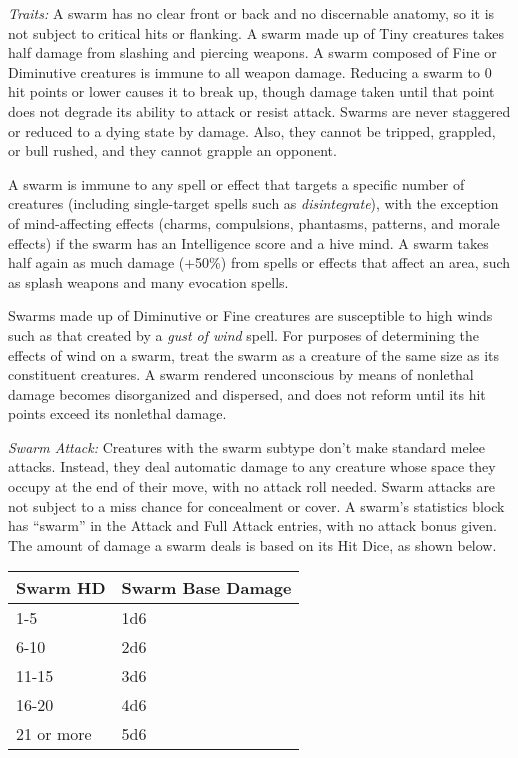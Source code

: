 \documentclass{article}
\begin{document}
\textit{Traits: }A swarm has no clear front or back and no discernable anatomy, 
so it is not subject to critical hits or flanking. A swarm made up of Tiny creatures 
takes half damage from slashing and piercing weapons. A swarm composed of Fine 
or Diminutive creatures is immune to all weapon damage. Reducing a swarm to 0 hit 
points or lower causes it to break up, though damage taken until that point does 
not degrade its ability to attack or resist attack. Swarms are never staggered 
or reduced to a dying state by damage. Also, they cannot be tripped, grappled, 
or bull rushed, and they cannot grapple an opponent.

A swarm is immune to any spell or effect that targets a specific number of creatures 
(including single-target spells such as \textit{disintegrate}), with the exception 
of mind-affecting effects (charms, compulsions, phantasms, patterns, and morale 
effects) if the swarm has an Intelligence score and a hive mind. A swarm takes 
half again as much damage (+50\%) from spells or effects that affect an area, such 
as splash weapons and many evocation spells.

Swarms made up of Diminutive or Fine creatures are susceptible to high winds such 
as that created by a \textit{gust of wind }spell. For purposes of determining the 
effects of wind on a swarm, treat the swarm as a creature of the same size as its 
constituent creatures. A swarm rendered unconscious by means of nonlethal damage 
becomes disorganized and dispersed, and does not reform until its hit points exceed 
its nonlethal damage.

\textit{Swarm Attack: }Creatures with the swarm subtype don't make standard melee 
attacks. Instead, they deal automatic damage to any creature whose space they occupy 
at the end of their move, with no attack roll needed. Swarm attacks are not subject 
to a miss chance for concealment or cover. A swarm's statistics block has ``swarm'' 
in the Attack and Full Attack entries, with no attack bonus given. The amount of 
damage a swarm deals is based on its Hit Dice, as shown below.

\begin{tabular}{|>{\raggedright}p{46pt}|>{\raggedright}p{89pt}|}
\hline
S\textbf{warm HD} & S\textbf{warm Base Damage}\tabularnewline
\hline
1-5 & 1d6\tabularnewline
\hline
6-10 & 2d6\tabularnewline
\hline
11-15 & 3d6\tabularnewline
\hline
16-20 & 4d6\tabularnewline
\hline
21 or more & 5d6\tabularnewline
\hline
\end{tabular}
\end{document}
